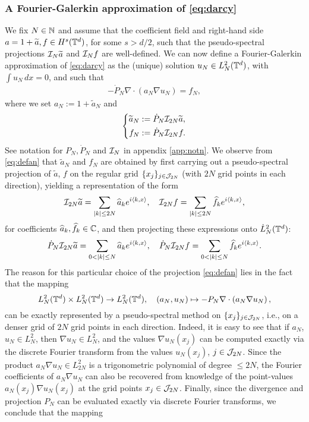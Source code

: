 \documentclass[reqno,a4paper]{amsart}
\begin{document}
\subsubsection{
A Fourier-Galerkin approximation of \eqref{eq:darcy}
}
We fix $N\in \mathbb{N}$ and assume that the coefficient field and right-hand side $a = 1+\widetilde{a},f \in H^{s}(\mathbb{T}^d)$, for some $s>d/2$, such that the pseudo-spectral projections $\mathcal{I}_N \widetilde{a}$ and $\mathcal{I}_Nf$ are well-defined. We can now define a Fourier-Galerkin approximation of \eqref{eq:darcy} as the (unique) solution $u_N \in L^2_N(\mathbb{T}^d)$, with $\int u_N \, dx = 0$, and such that
\begin{align} \label{eq:FG}
- \dot{P}_N \nabla \cdot (a_N \nabla u_N) = f_N,
\end{align}
where we set $a_N := 1+\tilde{a}_N$ and 
\begin{align} \label{eq:defan}
\left\{
\begin{aligned}
\widetilde{a}_N &:= \dot{P}_N\mathcal{I}_{2N}\widetilde{a},
\\
f_N &:= \dot{P}_N\mathcal{I}_{2N}f.
\end{aligned}
\right.
\end{align}
See notation for $P_N, \dot{P}_N$ and $\mathcal{I}_N$ in appendix \ref{app:notn}. We observe from \eqref{eq:defan} that $\tilde{a}_N$ and $f_N$ are obtained by first carrying out a pseudo-spectral projection of $\tilde{a}$, $f$ on the regular grid $\{x_j\}_{j\in \mathcal{J}_{2N}}$ (with $2N$ grid points in each direction), yielding a representation of the form
\[
\mathcal{I}_{2N}\widetilde{a} = \sum_{|k|\le 2N} \widehat{a}_k e^{i\langle k, x\rangle},
\quad
\mathcal{I}_{2N}f = \sum_{|k|\le 2N} \widehat{f}_k e^{i\langle k, x\rangle},
\]
for coefficients $\widehat{a}_k, \widehat{f}_k \in \mathbb{C}$, and then projecting these expressions onto $\dot{L}^2_N(\mathbb{T}^d)$:
\[
\dot{P}_N \mathcal{I}_{2N} \widetilde{a}
=
\sum_{0 < |k|\le N} \widehat{a}_k e^{i\langle k, x\rangle},
\quad
\dot{P}_N \mathcal{I}_{2N} f
=
\sum_{0 < |k|\le N} \widehat{f}_k e^{i\langle k, x\rangle}.
\]
The reason for this particular choice of the projection \eqref{eq:defan} lies in the fact that the mapping
\[
L^2_N(\mathbb{T}^d) \times L^2_N(\mathbb{T}^d)
\to 
L^2_N(\mathbb{T}^d), 
\quad 
(a_N, u_N) 
\mapsto
-P_N \nabla \cdot \left( a_N \nabla u_N \right),
\]
can be exactly represented by a pseudo-spectral method on $\{x_j\}_{j\in \mathcal{J}_{2N}}$, i.e., on a denser grid of $2N$ grid points in each direction. Indeed, it is easy to see that if $a_N$, $u_N\in L^2_N$, 
then \(\nabla u_N \in L^2_N \), and the values $\nabla u_N(x_j)$ can be computed exactly via the discrete Fourier transform from the values $u_N(x_j)$, $j\in \mathcal{J}_{2N}$. Since the product $a_N \nabla u_N\in L^2_{2N}$ is a trigonometric polynomial of degree $\le 2N$, the Fourier coefficients of $a_N\nabla u_N$ can also be recovered from knowledge of the point-values $a_N(x_j)\nabla u_N(x_j)$ at the grid points $x_j\in \mathcal{J}_{2N}$. Finally, since the divergence and projection $P_N$ can be evaluated exactly via discrete Fourier transforms, we conclude that the mapping
\end{document}

